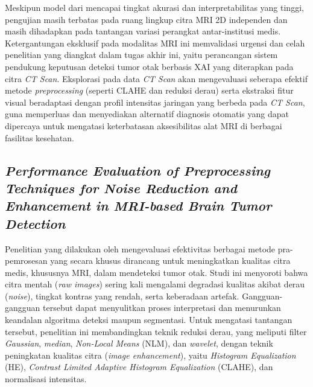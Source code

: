 Meskipun model dari \textcite{putra2025enhanced} mencapai tingkat akurasi dan interpretabilitas yang tinggi, pengujian masih terbatas pada ruang lingkup citra MRI 2D independen dan masih dihadapkan pada tantangan variasi perangkat antar-institusi medis. Ketergantungan eksklusif pada modalitas MRI ini memvalidasi urgensi dan celah penelitian yang diangkat dalam tugas akhir ini, yaitu perancangan sistem pendukung keputusan deteksi tumor otak berbasis XAI yang diterapkan pada citra \textit{CT Scan}. Eksplorasi pada data \textit{CT Scan} akan mengevaluasi seberapa efektif metode \textit{preprocessing} (seperti CLAHE dan reduksi derau) serta ekstraksi fitur visual beradaptasi dengan profil intensitas jaringan yang berbeda pada \textit{CT Scan}, guna memperluas dan menyediakan alternatif diagnosis otomatis yang dapat dipercaya untuk mengatasi keterbatasan aksesibilitas alat MRI di berbagai fasilitas kesehatan.

\subsection{\textit{Performance Evaluation of Preprocessing Techniques for Noise Reduction and Enhancement in MRI-based Brain Tumor Detection}}
Penelitian yang dilakukan oleh \textcite{flower2025performance} mengevaluasi efektivitas berbagai metode pra-pemrosesan yang secara khusus dirancang untuk meningkatkan kualitas citra medis, khususnya MRI, dalam mendeteksi tumor otak. Studi ini menyoroti bahwa citra mentah (\textit{raw images}) sering kali mengalami degradasi kualitas akibat derau (\textit{noise}), tingkat kontras yang rendah, serta keberadaan artefak. Gangguan-gangguan tersebut dapat menyulitkan proses interpretasi dan menurunkan keandalan algoritma deteksi maupun segmentasi. Untuk mengatasi tantangan tersebut, penelitian ini membandingkan teknik reduksi derau, yang meliputi filter \textit{Gaussian}, \textit{median}, \textit{Non-Local Means} (NLM), dan \textit{wavelet}, dengan teknik peningkatan kualitas citra (\textit{image enhancement}), yaitu \textit{Histogram Equalization} (HE), \textit{Contrast Limited Adaptive Histogram Equalization} (CLAHE), dan normalisasi intensitas.

